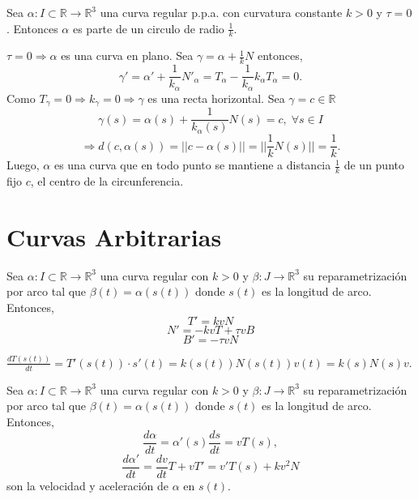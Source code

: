 \begin{prop}
  Sea $\alpha  : I \subset \mathbb{R} \to \mathbb{R}^{3}$ una curva regular p.p.a. con curvatura constante $k>0$ y $\tau = 0$. Entonces $\alpha$ es parte de un circulo de radio $\frac{1}{k}$.
\end{prop}

\begin{dem}
  $\tau = 0 \Rightarrow \alpha$ es una curva en plano. Sea $\gamma = \alpha + \frac{1}{k}N$ entonces,
  \[ 
    \gamma' = \alpha' + \frac{1}{k_{\alpha}}N'_{\alpha} = T_{\alpha} - \frac{1}{k_{\alpha}}k_{\alpha}T_{\alpha} = 0.
  \] 
  Como $T_{\gamma} = 0 \Rightarrow k_{\gamma} =0 \Rightarrow \gamma$ es una recta horizontal. Sea $\gamma = c \in \mathbb{R}$
  \[ 
    \gamma(s) = \alpha(s) + \frac{1}{k_{\alpha}(s)}N(s) = c, \; \forall s  \in I
  \] 
  \[ 
    \Rightarrow d(c, \alpha(s)) = ||c - \alpha(s)|| = ||\frac{1}{k}N(s)|| = \frac{1}{k}.
  \] 
  Luego, $\alpha$ es una curva que en todo punto se mantiene a distancia $\frac{1}{k}$ de un punto fijo $c$, el centro de la circunferencia.
\end{dem}

\section{Curvas Arbitrarias}

\begin{prop}
  Sea $\alpha  : I \subset \mathbb{R} \to \mathbb{R}^{3}$ una curva regular con $k>0$ y $\beta: J \to \mathbb{R}^{3}$ su reparametrización por arco tal que $\beta(t) = \alpha(s(t))$ donde $s(t)$ es la longitud de arco. Entonces, 
  \[ 
    T' = kvN 
  \] 
  \[ 
    N' = -kvT + \tau v B 
  \]
  \[ 
    B' = -\tau v N 
  \]
\end{prop}

\begin{dem}
  $\frac{d{T(s(t))}}{d{t}} = T'(s(t)) \cdot s'(t) = k(s(t)) N(s(t)) v(t) = k(s) N(s) v$.
\end{dem}

\begin{prop}
  Sea $\alpha  : I \subset \mathbb{R} \to \mathbb{R}^{3}$ una curva regular con $k>0$ y $\beta: J \to \mathbb{R}^{3}$ su reparametrización por arco tal que $\beta(t) = \alpha(s(t))$ donde $s(t)$ es la longitud de arco. Entonces, 
  \[ 
    \frac{d{\alpha}}{d{t}} = \alpha'(s) \frac{d{s}}{d{t}} = v T(s),
  \] 
  \[ 
    \frac{d{\alpha'}}{d{t}} = \frac{d{v}}{d{t}}T + vT' = v'T(s) + kv^{2}N 
  \] 
  son la velocidad y aceleración de $\alpha$ en $s(t)$.
\end{prop}

